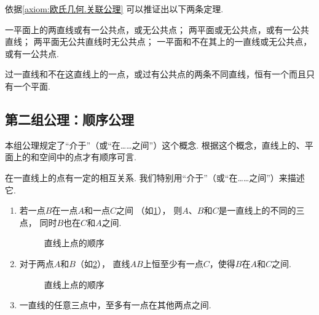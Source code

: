 依据\cref{axiom:欧氏几何.关联公理} 可以推证出以下两条定理.
\begin{theorem}\label{theorem:欧氏几何.定理1}
一平面上的两直线或有一公共点，或无公共点；
两平面或无公共点，或有一公共直线；
两平面无公共直线时无公共点；
一平面和不在其上的一直线或无公共点，或有一公共点.
\end{theorem}

\begin{theorem}\label{theorem:欧氏几何.定理2}
过一直线和不在这直线上的一点，或过有公共点的两条不同直线，恒有一个而且只有一个平面.
\end{theorem}

\subsection{第二组公理：顺序公理}
本组公理规定了“介于”（或“在……之间”）这个概念.
根据这个概念，直线上的、平面上的和空间中的点才有顺序可言.
\begin{axiom}[顺序公理I]\label{axiom:欧氏几何.顺序公理1}
在一直线上的点有一定的相互关系.
我们特别用“介于”（或“在……之间”）来描述它.
\begin{enumerate}
	\item 若一点\(B\)在一点\(A\)和一点\(C\)之间
	（如\cref{figure:欧氏几何.直线上点的顺序1}），
	则\(A\)、\(B\)和\(C\)是一直线上的不同的三点，
	同时\(B\)也在\(C\)和\(A\)之间.
	\begin{figure}[ht]
		\centering
		\caption{直线上点的顺序}
		\label{figure:欧氏几何.直线上点的顺序1}
	\end{figure}

	\item 对于两点\(A\)和\(B\)（如\cref{figure:欧氏几何.直线上点的顺序2}），
	直线\(AB\)上恒至少有一点\(C\)，使得\(B\)在\(A\)和\(C\)之间.
	\begin{figure}[ht]
		\centering
		\caption{直线上点的顺序}
		\label{figure:欧氏几何.直线上点的顺序2}
	\end{figure}

	\item 一直线的任意三点中，至多有一点在其他两点之间.
\end{enumerate}
\end{axiom}

